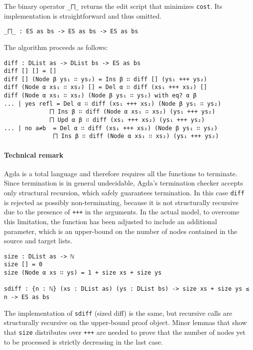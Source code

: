 \documentclass[../Thesis.tex]{subfiles}
\begin{document}
	The binary operator \texttt{\_⨅\_} returns the edit script that minimizes 	
	\texttt{cost}. Its implementation is straightforward and thus omitted.

\begin{verbatim}
_⨅_ : ES as bs -> ES as bs -> ES as bs
\end{verbatim}

	The algorithm proceeds as follows:

\begin{verbatim}
diff : DList as -> DList bs -> ES as bs
diff [] [] = []
diff [] (Node β ys₁ ∷ ys₂) = Ins β ∷ diff [] (ys₁ +++ ys₂)
diff (Node α xs₁ ∷ xs₂) [] = Del α ∷ diff (xs₁ +++ xs₂) []
diff (Node α xs₁ ∷ xs₂) (Node β ys₁ ∷ ys₂) with eq? α β
... | yes refl = Del α ∷ diff (xs₁ +++ xs₂) (Node β ys₁ ∷ ys₂) 
             ⨅ Ins β ∷ diff (Node α xs₁ ∷ xs₂) (ys₁ +++ ys₂) 
             ⨅ Upd α β ∷ diff (xs₁ +++ xs₂) (ys₁ +++ ys₂)
... | no a≠b  = Del α ∷ diff (xs₁ +++ xs₂) (Node β ys₁ ∷ ys₂) 
              ⨅ Ins β ∷ diff (Node α xs₁ ∷ xs₂) (ys₁ +++ ys₂)
\end{verbatim}
	
	\paragraph{Technical remark}
	Agda is a total language and therefore requires all the functions to 
	terminate. Since termination is in general undecidable, Agda's termination 
	checker accepts only structural recursion, which safely guarantees
	termination. In this case \texttt{diff} is rejected as possibly 
	non-terminating, because it is not structurally recursive
	due to the presence of \texttt{+++} in the arguments. 
	In the actual model, to overcome this limitation, the function has been 
	adjusted to include an additional parameter, which is an upper-bound 
	on the number of nodes contained in the source and target lists.
	
\begin{verbatim}
size : DList as -> ℕ 
size [] = 0
size (Node α xs ∷ ys) = 1 + size xs + size ys

sdiff : {n : ℕ} (xs : DList as) (ys : DList bs) -> size xs + size ys ≤ n -> ES as bs
\end{verbatim}
	
	The implementation of \texttt{sdiff} (sized diff) is the same, but recursive 
	calls	are structurally recursive on the upper-bound proof object.
	Minor lemmas that show that \texttt{size} distributes over \texttt{+++}
	are needed to prove that the number of nodes yet to be processed
	is strictly decreasing in the last case.
\end{document}

